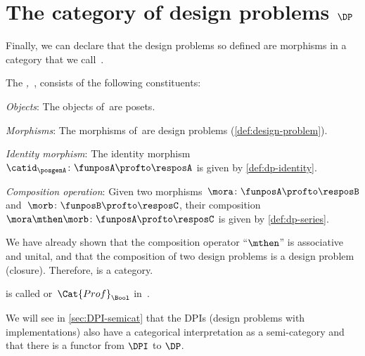 

\section{The category of design problems $\DP$}

Finally, we can declare that the design problems so defined are morphisms
in a category that we call~\iindex{\DP}.


\begin{definition}
    \label{def:DP}
    The \emph{,~\DP}, consists of the following constituents:
    \begin{compactenum}
        \item \emph{Objects}: The objects of~\DP are posets.
        \item \emph{Morphisms}: The morphisms of~\DP are design problems (\cref{def:design-problem}).
        \item \emph{Identity morphism}: The identity morphism~$\catid_\posgenA \colon \funposA \profto \resposA$ is given by \cref{def:dp-identity}.
        \item \emph{Composition operation}: Given two morphisms~$\mora \colon  \funposA \profto \resposB$ and~$\morb \colon \funposB \profto \resposC$, their
        composition~$\mora \mthen \morb\colon \funposA\profto \resposC$ is given by \cref{def:dp-series}.
    \end{compactenum}
\end{definition}

We have already shown that the composition operator ``$\mthen$'' is associative and unital, and that the composition of two design problems is a design problem (closure).
Therefore, \DP is a category.

\begin{remark}
    \DP is called \feas or~$\Cat{Prof}_\Bool$ in~\cite{fong2019}.
\end{remark}


\begin{remark}
    We will see in \cref{sec:DPI-semicat} that the DPIs (design problems with implementations) also have
    a categorical interpretation as a semi-category \DPI and that there is a functor from $\DPI$ to $\DP$.
\end{remark}
